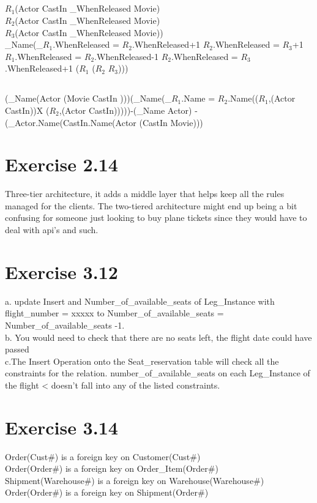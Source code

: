 \documentclass[11pt]{article}
\theoremstyle{plain}
\theoremstyle{definition}
\begin{document}
\subsection{}
\rho $R_1$(Actor \bowtie CastIn \: \bowie \sigma_{WhenReleased} \bowtie Movie)\\
\rho $R_2$(Actor \bowtie CastIn \: \bowie \sigma_{WhenReleased} \bowtie Movie)\\
\rho$R_3$(Actor \bowtie CastIn \: \bowie \sigma_{WhenReleased} \bowtie Movie))\\
\pi_{Name}(\sigma_{$R_1$.WhenReleased = $R_2$.WhenReleased+1 \wedge $R_2$.WhenReleased = $R_3$+1 \vee $R_1$.WhenReleased = $R_2$.WhenReleased-1 \wedge $R_2$.WhenReleased = $R_3$.WhenReleased+1 }($R_1$ \bowtie ($R_2$ \bowtie $R_3$)))
\subsection{}
(\pi_{Name}(Actor \bowtie \:(Movie \bowtie CastIn )))\bowtie(\pi_{Name}(\sigma_{$R_1$.Name = $R_2$.Name}(\rho($R_1$,(Actor \bowtie CastIn))X \rho($R_2$,(Actor \bowtie CastIn)))))-(\sigma_{Name} Actor) - (\pi_{Actor.Name}(\sigma CastIn.Name(Actor \bowtie (CastIn \bowtie Movie)))
\section{Exercise 2.14}
Three-tier architecture, it adds a middle layer that helps keep all the rules managed for the clients.
The two-tiered architecture might end up being a bit confusing for someone just looking to buy plane tickets since they would have to deal with api's and such.
\section{Exercise 3.12}
a. update Insert and Number\_of\_available\_seats of Leg\_Instance with flight\_number = xxxxx to Number\_of\_available\_seats = Number\_of\_available\_seats -1.\\
b. You would need to check that there are no seats left, the flight date could have passed\\
c.The Insert Operation onto the Seat\_reservation table will check all the constraints for the relation.
number\_of\_available\_seats on each Leg\_Instance of the flight \textless {} doesn't fall into any of the listed constraints.\\

\section{Exercise 3.14}
 Order(Cust\#) is a foreign key on Customer(Cust\#) \\
 Order(Order\#) is a foreign key on Order\_Item(Order\#)\\
 Shipment(Warehouse\#)  is a foreign key on Warehouse(Warehouse\#)\\
  Order(Order\#)  is a foreign key on Shipment(Order\#)

 
\end{document}
